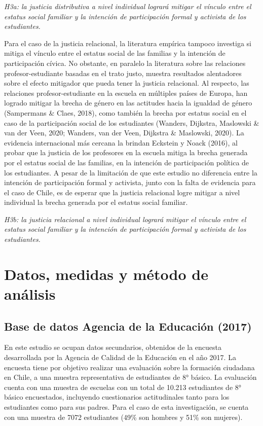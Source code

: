 \documentclass[12pt,twoside]{templates/facsothesis}
\begin{document}
\emph{H3a: la justicia distributiva a nivel individual logrará mitigar el vínculo entre el estatus social familiar y la intención de participación formal y activista de los estudiantes.}

Para el caso de la justicia relacional, la literatura empírica tampoco investiga si mitiga el vínculo entre el estatus social de las familias y la intención de participación cívica. No obstante, en paralelo la literatura sobre las relaciones profesor-estudiante basadas en el trato justo, muestra resultados alentadores sobre el efecto mitigador que pueda tener la justicia relacional. Al respecto, las relaciones profesor-estudiante en la escuela en múltiples países de Europa, han logrado mitigar la brecha de género en las actitudes hacia la igualdad de género (Sampermans \& Claes, 2018), como también la brecha por estatus social en el caso de la participación social de los estudiantes (Wanders, Dijkstra, Maslowski \& van der Veen, 2020; Wanders, van der Veen, Dijkstra \& Maslowski, 2020). La evidencia internacional más cercana la brindan Eckstein y Noack (2016), al probar que la justicia de los profesores en la escuela mitiga la brecha generada por el estatus social de las familias, en la intención de participación política de los estudiantes. A pesar de la limitación de que este estudio no diferencia entre la intención de participación formal y activista, junto con la falta de evidencia para el caso de Chile, es de esperar que la justicia relacional logre mitigar a nivel individual la brecha generada por el estatus social familiar.

\emph{H3b: la justicia relacional a nivel individual logrará mitigar el vínculo entre el estatus social familiar y la intención de participación formal y activista de los estudiantes.}

\hypertarget{datos-medidas-y-muxe9todo-de-anuxe1lisis}{%
\chapter{Datos, medidas y método de análisis}\label{datos-medidas-y-muxe9todo-de-anuxe1lisis}}

\hypertarget{base-de-datos-agencia-de-la-educaciuxf3n-2017}{%
\section{Base de datos Agencia de la Educación (2017)}\label{base-de-datos-agencia-de-la-educaciuxf3n-2017}}

En este estudio se ocupan datos secundarios, obtenidos de la encuesta desarrollada por la Agencia de Calidad de la Educación en el año 2017. La encuesta tiene por objetivo realizar una evaluación sobre la formación ciudadana en Chile, a una muestra representativa de estudiantes de 8° básico. La evaluación cuenta con una muestra de escuelas con un total de 10.213 estudiantes de 8° básico encuestados, incluyendo cuestionarios actitudinales tanto para los estudiantes como para sus padres. Para el caso de esta investigación, se cuenta con una muestra de 7072 estudiantes (49\% son hombres y 51\% son mujeres).
\end{document}

